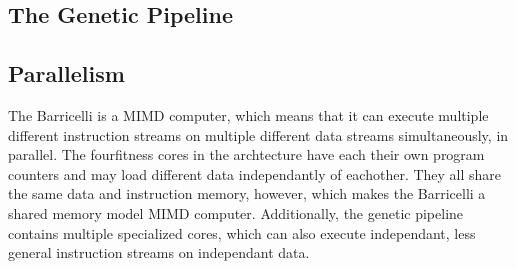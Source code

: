 \subsection{The Genetic Pipeline}
\label{fpga:subsection:genetic_pipeline}


\subsection{Parallelism}
The Barricelli is a MIMD computer, which means that it can execute multiple different instruction streams on multiple different data streams simultaneously, in parallel.
The four\cn fitness cores in the archtecture have each their own program counters and may load different data independantly of eachother.
They all share the same data and instruction memory, however, which makes the Barricelli a shared memory model MIMD computer.
Additionally, the genetic pipeline contains multiple specialized cores, which can also execute independant, less general instruction streams on independant data.

